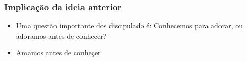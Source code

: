 \begin{frame}
	\frametitle{Implicação da ideia anterior}

	\begin{itemize}
		\item <1>Uma questão importante dos discipulado é: Conhecemos para adorar, ou adoramos antes de conhecer?\footnotemark
		\item <2>Amamos antes de conheçer
	\end{itemize}

\end{frame}

